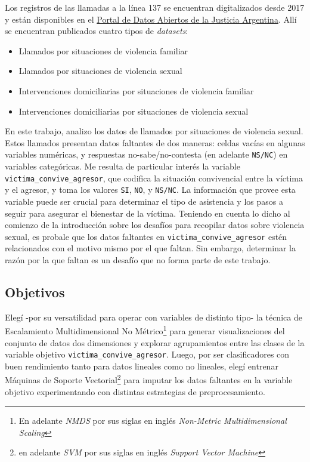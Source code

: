 \documentclass[10 pt]{article}
\begin{document}
Los registros de las llamadas a la línea 137 se encuentran digitalizados desde 2017 y están disponibles en el \href{http://datos.jus.gob.ar/}{Portal de Datos Abiertos de la Justicia Argentina}. Allí se encuentran publicados cuatro tipos de \textit{datasets}: 

\begin{itemize}
    \item Llamados por situaciones de violencia familiar
    \item Llamados por situaciones de violencia sexual
    \item Intervenciones domiciliarias por situaciones de violencia familiar
    \item Intervenciones domiciliarias por situaciones de violencia sexual
\end{itemize}

En este trabajo, analizo los datos de llamados por situaciones de violencia sexual. Estos llamados presentan datos faltantes de dos maneras: celdas vacías en algunas variables numéricas, y respuestas no-sabe/no-contesta (en adelante \texttt{NS/NC}) en variables categóricas. Me resulta de particular interés la variable \texttt{victima\_convive\_agresor}, que codifica la situación convivencial entre la víctima y el agresor, y toma los valores \texttt{SI}, \texttt{NO}, y \texttt{NS/NC}. La información que provee esta variable puede ser crucial para determinar el tipo de asistencia y los pasos a seguir para asegurar el bienestar de la víctima. Teniendo en cuenta lo dicho al comienzo de la introducción sobre los desafíos para recopilar datos sobre violencia sexual, es probale que los datos faltantes en \texttt{victima\_convive\_agresor} estén relacionados con el motivo mismo por el que faltan. Sin embargo, determinar la razón por la que faltan es un desafío que no forma parte de este trabajo. 


\subsection{Objetivos}

Elegí -por su versatilidad para operar con variables de distinto tipo- la técnica de Escalamiento Multidimensional No Métrico\footnote{En adelante \textit{NMDS} por sus siglas en inglés \textit{Non-Metric Multidimensional Scaling}} para generar visualizaciones del conjunto de datos dos dimensiones y explorar agrupamientos entre las clases de la variable objetivo \texttt{victima\_convive\_agresor}. Luego, por ser clasificadores con buen rendimiento tanto para datos lineales como no lineales, elegí entrenar Máquinas de Soporte Vectorial\footnote{en adelante \textit{SVM} por sus siglas en inglés \textit{Support Vector Machine}} para imputar los datos faltantes en la variable objetivo experimentando con distintas estrategias de preprocesamiento. 
\end{document}

